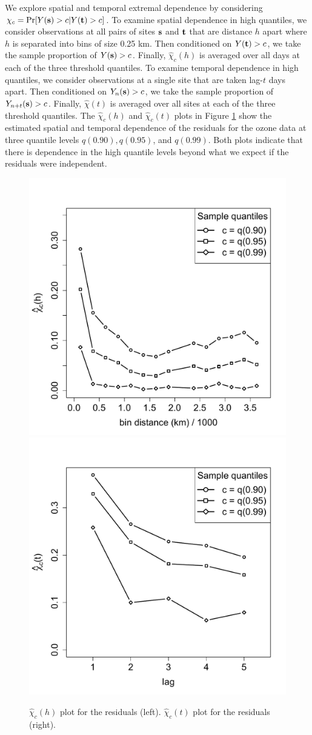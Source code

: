 \documentclass[11pt]{article}
\begin{document}
We explore spatial and temporal extremal dependence by considering $\chi_c = \Pr[Y(\mbox{\bf s}) > c | Y(\mbox{\bf t}) > c]$.
To examine spatial dependence in high quantiles, we consider observations at all pairs of sites $\mbox{\bf s}$ and $\mbox{\bf t}$ that are distance $h$ apart where $h$ is separated into bins of size 0.25 km.
Then conditioned on $Y(\mbox{\bf t}) > c$, we take the sample proportion of $Y(\mbox{\bf s}) > c$.
Finally, $\widehat{\chi}_c(h)$ is averaged over all days at each of the three threshold quantiles.
To examine temporal dependence in high quantiles, we consider observations at a single site that are taken lag-$t$ days apart.
Then conditioned on $Y_n(\mbox{\bf s}) > c$, we take the sample proportion of $Y_{n + t}(\mbox{\bf s}) > c$.
Finally, $\widehat{\chi}(t)$ is averaged over all sites at each of the three threshold quantiles.
The $\widehat{\chi}_c(h)$ and $\widehat{\chi}_c(t)$ plots in Figure \ref{fig:chi-st} show the estimated spatial and temporal dependence of the residuals for the ozone data at three quantile levels $q(0.90), q(0.95)$, and $q(0.99)$.
Both plots indicate that there is dependence in the high quantile levels beyond what we expect if the residuals were independent.
\begin{figure}
  \centering
  \includegraphics[width=0.49\linewidth]{plots/chi-h-ozone.pdf}
  \includegraphics[width=0.49\linewidth]{plots/chi-t-ozone.pdf}
  \caption{$\widehat{\chi}_c(h)$ plot for the residuals (left). $\widehat{\chi}_c(t)$ plot for the residuals (right).}
  \label{fig:chi-st}
\end{figure}
\end{document}
